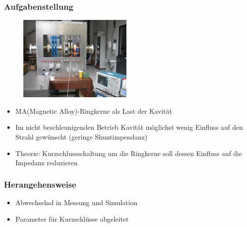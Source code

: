 \documentclass[accentcolor=tud9b, colorbacktitle, inverttitle]{tudbeamer}
\begin{document}
\begin{frame}\frametitle{Aufgabenstellung}
\vspace{-1em}
\begin{multicols}{2}
	\begin{figure}[h]
		\centering
		\includegraphics[width=0.5\textwidth]{Kavitaet}
	\end{figure}
	\vfill\null
	\columnbreak
	\begin{itemize}
		\item MA(Magnetic Alloy)-Ringkerne als Last der Kavit\"at
		\item Im nicht beschleunigenden Betrieb Kavit\"at m\"oglichst wenig Einfluss auf den Strahl gewünscht (geringe Shuntimpendanz)
		\item Theorie: Kurzschlussschaltung um die Ringkerne soll dessen Einfluss auf die Impedanz reduzieren
	\end{itemize}
\end{multicols}
\end{frame}


\begin{frame}\frametitle{Herangehensweise}
\begin{itemize}
	\item Abwechselnd in Messung und Simulation
	\item Parameter f\"ur Kurzschl\"usse abgeleitet
\end{itemize}
\end{frame}
\end{document}
